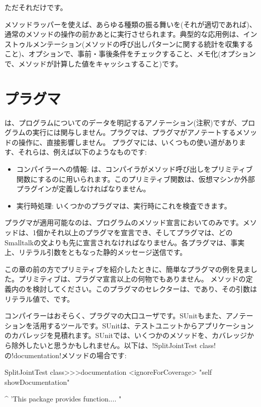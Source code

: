 \documentclass[a4paper,10pt,twoside]{book}
\begin{document}
ただそれだけです。

メソッドラッパーを使えば、あらゆる種類の振る舞いを(それが適切であれば)、通常のメソッドの操作の前かあとに実行させられます。典型的な応用例は、インストゥルメンテーション(メソッドの呼び出しパターンに関する統計を収集すること)、オプションで、事前・事後条件をチェックすること、メモ化(オプションで、メソッドが計算した値をキャッシュすること)です。

\section{プラグマ}

は、プログラムについてのデータを明記するアノテーション(注釈)ですが、プログラムの実行には関与しません。プラグマは、プラグマがアノテートするメソッドの操作に、直接影響しません。
プラグマには、いくつもの使い道があります、それらは、例えば以下のようなものです:
\begin{itemize}
\item コンパイラーへの情報: は、コンパイラがメソッド呼び出しをプリミティブ関数にするのに用いられます。このプリミティブ関数は、仮想マシンか外部プラグインが定義しなければなりません。
\item 実行時処理: いくつかのプラグマは、実行時にこれを検査できます。
\end{itemize}

プラグマが適用可能なのは、プログラムのメソッド宣言においてのみです。メソッドは、1個かそれ以上のプラグマを宣言でき、そしてプラグマは、どのSmalltalkの文よりも先に宣言されなければなりません。各プラグマは、事実上、リテラル引数をともなった静的メッセージ送信です。

この章の前の方でプリミティブを紹介したときに、簡単なプラグマの例を見ました。プリミティブは、プラグマ宣言以上の何物でもありません。
メソッドの定義内のを検討してください。このプラグマのセレクターは、であり、その引数はリテラル値で、です。

コンパイラーはおそらく、プラグマの大口ユーザです。SUnitもまた、アノテーションを活用するツールです。SUnitは、テストユニットからアプリケーションのカバレッジを見積れます。SUnitでは、いくつかのメソッドを、カバレッジから除外したいと思うかもしれません。以下は、\ct!SplitJointTest class!の\ct!documentation!メソッドの場合です:

\begin{code}{}
SplitJointTest class>>>documentation
	<ignoreForCoverage>
	"self showDocumentation"
	
	^ 'This package provides function.... "
\end{code}
\end{document}
